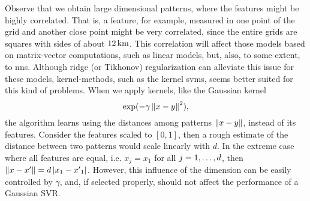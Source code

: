 %
Observe that we obtain large dimensional patterns, where the features might be highly correlated. That is, a feature,  for example, measured in one point of the grid and another close point might be very correlated, since the entire grids are squares with sides of about $\SI{12}{\kilo\metre}$.
This correlation will affect those models based on matrix-vector computations, such as linear models, but, also, to some extent, to \acrshort{nns}.
Although ridge (or Tikhonov) regularization can alleviate this issue for these models, kernel-methods, such as the kernel \acrshort{svm}s, seems better suited for this kind of problems.
When we apply kernels, like the Gaussian kernel $$\exp({-\gamma \left\lVert x-y\right\rVert^2}),$$ the algorithm learns using the distances among patterns $\left\lVert x - y\right\rVert$, instead of its features.
%
Consider the features scaled to $[0, 1]$, then a rough estimate of the distance between two patterns would scale linearly with $d$. In the extreme case where all features are equal, i.e. $x_j = x_1$ for all $j=1, \ldots, d$, then $\left\lVert x - x'\right\rVert = d \left|x_1 - {x'}_1\right| $.
However, this influence of the dimension can be easily controlled by $\gamma$, and, if selected properly, should not affect the performance of a Gaussian SVR.

